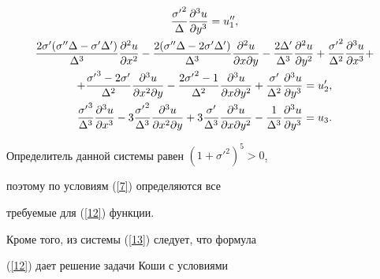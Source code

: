 \begin{gather}
\frac{{\sigma'}^2}{\Delta}\frac{\partial^3 u}{\partial y^3}


=u''_{1},\notag \\


%


%


\frac{2\sigma'(\sigma''\Delta-\sigma'\Delta')}{\Delta^3}


\frac{\partial^2 u}{\partial x^2}


-\frac{2(\sigma''\Delta-2\sigma'\Delta')}{\Delta^3}


\frac{\partial^2 u}{\partial x \partial y}-


\frac{2\Delta'}{\Delta^3}\frac{\partial^2 u}{\partial y^2}


+\frac{{\sigma'}^2}{\Delta^2}\frac{\partial^3 u}{\partial x^3}+\notag \\


%


+\frac{{\sigma'}^3-2\sigma'}{\Delta^2}


\frac{\partial^3 u}{\partial x^2 \partial y}-


\frac{2{\sigma'}^2-1}{\Delta^2}


\frac{\partial^3 u}{\partial x \partial y^2}


+\frac{\sigma'}{\Delta^2}\frac{\partial^3 u}{\partial y^3}


=u'_{2},\notag \\


%


\frac{{\sigma'}^3}{\Delta^3}\frac{\partial^3 u}{\partial x^3}


-3\frac{{\sigma'}^2}{\Delta^3}


\frac{\partial^3 u}{\partial x^2 \partial y}


+3\frac{\sigma'}{\Delta^3}


\frac{\partial^3 u}{\partial x \partial y^2}


-\frac{1}{\Delta^3}\frac{\partial^3 u}{\partial y^3}=u_{3}.\notag


\end{gather}


Определитель данной системы равен $(1+{\sigma'}^2)^5>0$,


поэтому по условиям (\ref{7}) определяются все


требуемые для (\ref{12}) функции.





Кроме того,  из системы (\ref{13}) следует, что формула


(\ref{12}) дает решение задачи Коши с условиями



